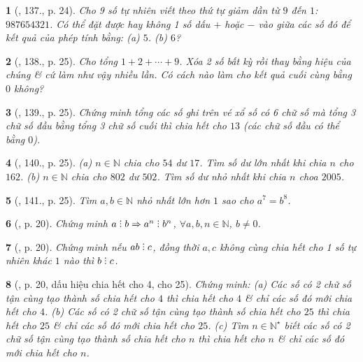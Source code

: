 \documentclass{article}
\newtheorem{baitoan}{}
\DeclareRobustCommand{\divby}{%
	\mathrel{\vbox{\baselineskip.65ex\lineskiplimit0pt\hbox{.}\hbox{.}\hbox{.}}}%
}
\begin{document}
\begin{baitoan}[\cite{Binh_Toan_6_tap_1}, 137., p. 24]
	Cho 9 số tự nhiên viết theo thứ tự giảm dần từ $9$ đến $1$: $987654321$. Có thể đặt được hay không 1 số dấu $+$ hoặc $-$ vào giữa các số đó để kết quả của phép tính bằng: (a) $5$. (b) $6$?
\end{baitoan}

\begin{baitoan}[\cite{Binh_Toan_6_tap_1}, 138., p. 25]
	Cho tổng $1 + 2 + \cdots + 9$. Xóa 2 số bất kỳ rồi thay bằng hiệu của chúng \& cứ làm như vậy nhiều lần. Có cách nào làm cho kết quả cuối cùng bằng $0$ không?
\end{baitoan}

\begin{baitoan}[\cite{Binh_Toan_6_tap_1}, 139., p. 25]
	Chứng minh tổng các số ghi trên vé xổ số có 6 chữ số mà tổng 3 chữ số đầu bằng tổng 3 chữ số cuối thì chia hết cho $13$ (các chữ số đầu có thể bằng $0$).
\end{baitoan}

\begin{baitoan}[\cite{Binh_Toan_6_tap_1}, 140., p. 25]
	(a) $n\in\mathbb{N}$ chia cho $54$ dư $17$. Tìm số dư lớn nhất khi chia $n$ cho $162$. (b) $n\in\mathbb{N}$ chia cho $802$ dư $502$. Tìm số dư nhỏ nhất khi chia $n$ choa $2005$.
\end{baitoan}

\begin{baitoan}[\cite{Binh_Toan_6_tap_1}, 141., p. 25]
	Tìm $a,b\in\mathbb{N}$ nhỏ nhất lớn hơn $1$ sao cho $a^7 = b^8$.
\end{baitoan}

\begin{baitoan}[\cite{TLCT_THCS_Toan_6_so_hoc}, p. 20]
	Chứng minh $a\divby b\Rightarrow a^n\divby b^n$, $\forall a,b,n\in\mathbb{N}$, $b\ne0$.
\end{baitoan}

\begin{baitoan}[\cite{TLCT_THCS_Toan_6_so_hoc}, p. 20]
	Chứng minh nếu $ab\divby c$, đồng thời $a,c$ không cùng chia hết cho 1 số tự nhiên khác $1$ nào thì $b\divby c$.
\end{baitoan}

\begin{baitoan}[\cite{TLCT_THCS_Toan_6_so_hoc}, p. 20, dấu hiệu chia hết cho 4, cho 25]
	Chứng minh: (a) Các số có 2 chữ số tận cùng tạo thành số chia hết cho $4$ thì chia hết cho $4$ \& chỉ các số đó mới chia hết cho $4$. (b) Các số có 2 chữ số tận cùng tạo thành số chia hết cho $25$ thì chia hết cho $25$ \& chỉ các số đó mới chia hết cho $25$. (c) Tìm $n\in\mathbb{N}^\star$ biết các số có 2 chữ số tận cùng tạo thành số chia hết cho $n$ thì chia hết cho $n$ \& chỉ các số đó mới chia hết cho $n$.
\end{baitoan}
\end{document}
